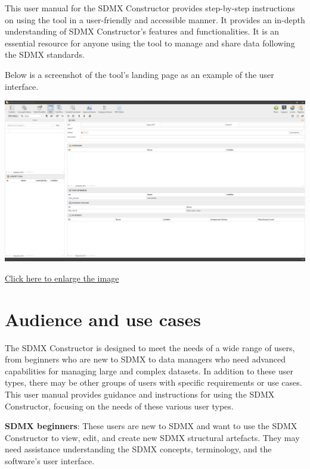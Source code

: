 \documentclass[
]{book}
\begin{document}
This user manual for the SDMX Constructor provides step-by-step instructions on using the tool in a user-friendly and accessible manner. It provides an in-depth understanding of SDMX Constructor's features and functionalities. It is an essential resource for anyone using the tool to manage and share data following the SDMX standards.

Below is a screenshot of the tool's landing page as an example of the user interface.

\begin{center}\includegraphics[width=1\linewidth]{./images/image001} \end{center}

\href{images/image001.png}{Click here to enlarge the image}

\hypertarget{audience-and-use-cases}{%
\section*{Audience and use cases}\label{audience-and-use-cases}}

The SDMX Constructor is designed to meet the needs of a wide range of users, from beginners who are new to SDMX to data managers who need advanced capabilities for managing large and complex datasets. In addition to these user types, there may be other groups of users with specific requirements or use cases. This user manual provides guidance and instructions for using the SDMX Constructor, focusing on the needs of these various user types.

\textbf{SDMX beginners}: These users are new to SDMX and want to use the SDMX Constructor to view, edit, and create new SDMX structural artefacts. They may need assistance understanding the SDMX concepts, terminology, and the software's user interface.
\end{document}
